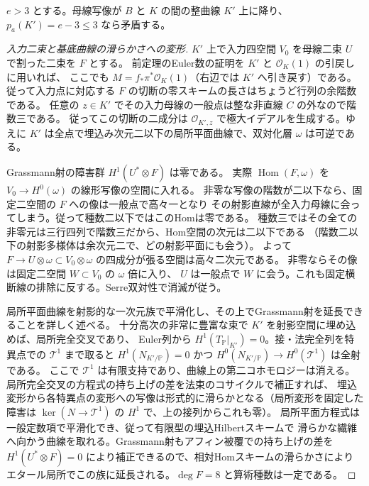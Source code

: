 \begin{proposition}\label{prop:cofactor-kernel-smoothing}
$e>3$ とする。母線写像が $B$ と $K$ の間の整曲線 $K'$ 上に降り、
$p_a(K')=e-3\le3$ なら矛盾する。
\end{proposition}
\begin{proof}[入力二束と基底曲線の滑らかさへの変形]
$K'$ 上で入力四空間 $V_0$ を母線二束 $U$ で割った二束を $F$ とする。
前定理のEuler数の証明を $K'$ と $\mathcal O_K(1)$ の引戻しに用いれば、
ここでも $M=f_*\pi^*\mathcal O_K(1)$（右辺では $K'$ へ引き戻す）である。
従って入力点に対応する $F$ の切断の零スキームの長さはちょうど行列の余階数である。
任意の $z\in K'$ でその入力母線の一般点は整な非直線 $C$ の外なので階数三である。
従ってこの切断の二成分は $\mathcal O_{K',z}$ で極大イデアルを生成する。ゆえに
$K'$ は全点で埋込み次元二以下の局所平面曲線で、双対化層 $\omega$ は可逆である。

Grassmann射の障害群 $H^1(U^*\otimes F)$ は零である。
実際 $\operatorname{Hom}(F,\omega)$ を $V_0\to H^0(\omega)$ の線形写像の空間に入れる。
非零な写像の階数が二以下なら、固定二空間の $F$ への像は一般点で高々一となり
その射影直線が全入力母線に会ってしまう。従って種数二以下ではこのHomは零である。
種数三ではその全ての非零元は三行四列で階数三だから、Hom空間の次元は二以下である
（階数二以下の射影多様体は余次元二で、どの射影平面にも会う）。
よって $F\to U\otimes\omega\subset V_0\otimes\omega$ の四成分が張る空間は高々二次元である。
非零ならその像は固定二空間 $W\subset V_0$ の $\omega$ 倍に入り、
$U$ は一般点で $W$ に会う。これも固定横断線の排除に反する。Serre双対性で消滅が従う。

局所平面曲線を射影的な一次元族で平滑化し、その上でGrassmann射を延長できることを詳しく述べる。
十分高次の非常に豊富な束で $K'$ を射影空間に埋め込めば、局所完全交叉であり、
Euler列から $H^1(T_{\mathbb P}|_{K'})=0$。接・法完全列を特異点での $\mathcal T^1$ まで取ると
$H^1(N_{K'/\mathbb P})=0$ かつ $H^0(N_{K'/\mathbb P})\to H^0(\mathcal T^1)$ は全射である。
ここで $\mathcal T^1$ は有限支持であり、曲線上の第二コホモロジーは消える。
局所完全交叉の方程式の持ち上げの差を法束のコサイクルで補正すれば、
埋込変形から各特異点の変形への写像は形式的に滑らかとなる（局所変形を固定した障害は
$\ker(N\to\mathcal T^1)$ の $H^1$ で、上の接列からこれも零）。
局所平面方程式は一般定数項で平滑化でき、従って有限型の埋込Hilbertスキームで
滑らかな繊維へ向かう曲線を取れる。Grassmann射もアフィン被覆での持ち上げの差を
$H^1(U^*\otimes F)=0$ により補正できるので、相対Homスキームの滑らかさにより
エタール局所でこの族に延長される。$\deg F=8$ と算術種数は一定である。
\end{proof}

